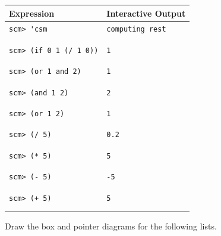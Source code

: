 \documentclass{exam}
\begin{document}
\begin{questions}
\begin{solution}
\begin{center}
    \begin{tabular}{|m{9cm}|m{5cm}|}
\hline
\textbf{Expression} & \textbf{Interactive Output} \\
\hline
\lstinline$scm> 'csm$ & {\color{red} \lstinline$computing rest$}\\ & \\ & \\
\hline
\lstinline$scm> (if 0 1 (/ 1 0))$ & {\color{red} \lstinline$1$}\\ & \\ & \\
\hline
\lstinline$scm> (or 1 and 2)$ & {\color{red} \lstinline$1$}\\ & \\ & \\
\hline
\lstinline$scm> (and 1 2)$ & {\color{red} \lstinline$2$}\\ & \\ & \\
\hline
\lstinline$scm> (or 1 2)$ & {\color{red} \lstinline$1$}\\ & \\ & \\
\hline
\lstinline$scm> (/ 5)$ & {\color{red} \lstinline$0.2$}\\ & \\ & \\
\hline
\lstinline$scm> (* 5)$ & {\color{red} \lstinline$5$}\\ & \\ & \\
\hline
\lstinline$scm> (- 5)$ & {\color{red} \lstinline$-5$}\\ & \\ & \\
\hline
\lstinline$scm> (+ 5)$ & {\color{red} \lstinline$5$}\\ & \\ & \\
\hline
\end{tabular}
\end{center}
\end{solution}

\item Draw the box and pointer diagrams for the following lists.


\end{questions}
\end{document}
